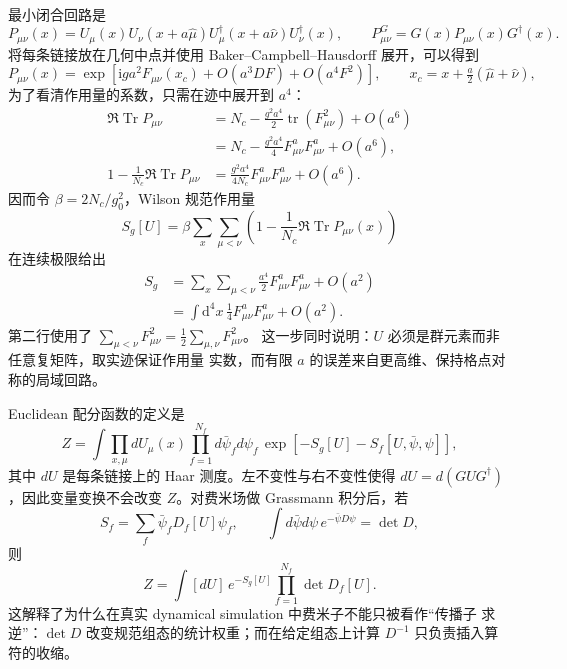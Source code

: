 \documentclass[UTF8,11pt,oneside]{ctexbook}
\newcommand{\dd}{\mathrm{d}}
\begin{document}
最小闭合回路是
\begin{equation}
 P_{\mu\nu}(x)=U_\mu(x)U_\nu(x+a\hat\mu)
 U_\mu^\dagger(x+a\hat\nu)U_\nu^\dagger(x),
 \qquad P_{\mu\nu}^G=G(x)P_{\mu\nu}(x)G^\dagger(x).
 \label{eq:deep-plaquette}
\end{equation}
将每条链接放在几何中点并使用 Baker--Campbell--Hausdorff 展开，可以得到
\begin{equation}
 P_{\mu\nu}(x)
 =\exp\left[\mathrm{i}g a^2F_{\mu\nu}(x_c)
 +O(a^3D F)+O(a^4F^2)\right],
 \qquad x_c=x+\tfrac a2(\hat\mu+\hat\nu),
 \label{eq:deep-plaquette-bch}
\end{equation}
为了看清作用量的系数，只需在迹中展开到 \(a^4\)：
\begin{align}
 \Re\operatorname{Tr}P_{\mu\nu}
 &=N_c-\frac{g^2a^4}{2}\operatorname{tr}(F_{\mu\nu}^2)+O(a^6)
 \label{eq:deep-plaquette-trace}\\
 &=N_c-\frac{g^2a^4}{4}F_{\mu\nu}^aF_{\mu\nu}^a+O(a^6),
 \nonumber\\
 1-\frac1{N_c}\Re\operatorname{Tr}P_{\mu\nu}
 &=\frac{g^2a^4}{4N_c}F_{\mu\nu}^aF_{\mu\nu}^a+O(a^6).
 \label{eq:deep-plaquette-real}
\end{align}
因而令 \(\beta=2N_c/g_0^2\)，Wilson 规范作用量
\begin{equation}
 S_g[U]=\beta\sum_x\sum_{\mu<\nu}
 \left(1-\frac1{N_c}\Re\operatorname{Tr}P_{\mu\nu}(x)\right)
 \label{eq:deep-wilson-gauge-action}
\end{equation}
在连续极限给出
\begin{align}
 S_g
 &=\sum_x\sum_{\mu<\nu}\frac{a^4}{2}F_{\mu\nu}^aF_{\mu\nu}^a+O(a^2)\\
 &=\int\dd^4x\,\frac14F_{\mu\nu}^aF_{\mu\nu}^a+O(a^2).
 \label{eq:deep-wilson-continuum}
\end{align}
第二行使用了 \(\sum_{\mu<\nu}F_{\mu\nu}^2=\frac12\sum_{\mu,\nu}F_{\mu\nu}^2\)。
这一步同时说明：\(U\) 必须是群元素而非任意复矩阵，取实迹保证作用量
实数，而有限 \(a\) 的误差来自更高维、保持格点对称的局域回路。

Euclidean 配分函数的定义是
\begin{equation}
 Z=\int\prod_{x,\mu}dU_\mu(x)
 \prod_{f=1}^{N_f}d\bar\psi_f d\psi_f\,
 \exp[-S_g[U]-S_f[U,\bar\psi,\psi]],
 \label{eq:deep-partition-function}
\end{equation}
其中 \(dU\) 是每条链接上的 Haar 测度。左不变性与右不变性使得
\(dU=d(GUG^\dagger)\)，因此变量变换不会改变 \(Z\)。对费米场做 Grassmann
积分后，若
\begin{equation}
 S_f=\sum_f\bar\psi_fD_f[U]\psi_f,
 \qquad
 \int d\bar\psi d\psi\,e^{-\bar\psi D\psi}=\det D,
 \label{eq:deep-fermion-determinant}
\end{equation}
则
\begin{equation}
 Z=\int[dU]\,e^{-S_g[U]}
 \prod_{f=1}^{N_f}\det D_f[U].
 \label{eq:deep-gauge-only-partition}
\end{equation}
这解释了为什么在真实 dynamical simulation 中费米子不能只被看作“传播子
求逆”：\(\det D\) 改变规范组态的统计权重；而在给定组态上计算
\(D^{-1}\) 只负责插入算符的收缩。
\end{document}
